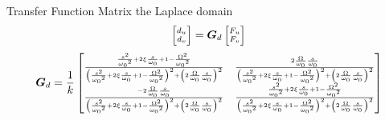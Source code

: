 \documentclass[t, minted]{clean-beamer}
\begin{document}
\begin{frame}[label={sec:org9fc6840}]{Transfer Function Matrix the Laplace domain}
\vspace{-1em}
\begin{equation*}
  {\scriptsize \begin{bmatrix} d_u \\ d_v \end{bmatrix} = \bm{G}_d \begin{bmatrix} F_u \\ F_v \end{bmatrix}}
\end{equation*}
\begin{equation*}
  {\scriptsize \bm{G}_{d} =
               \frac{1}{k}
               \begin{bmatrix}
                 \frac{\frac{s^2}{{\omega_0}^2} + 2 \xi \frac{s}{\omega_0} + 1 - \frac{{\Omega}^2}{{\omega_0}^2}}{\left( \frac{s^2}{{\omega_0}^2} + 2 \xi \frac{s}{\omega_0} + 1 - \frac{{\Omega}^2}{{\omega_0}^2} \right)^2 + \left( 2 \frac{\Omega}{\omega_0} \frac{s}{\omega_0} \right)^2} & \frac{2 \frac{\Omega}{\omega_0} \frac{s}{\omega_0}}{\left( \frac{s^2}{{\omega_0}^2} + 2 \xi \frac{s}{\omega_0} + 1 - \frac{{\Omega}^2}{{\omega_0}^2} \right)^2 + \left( 2 \frac{\Omega}{\omega_0} \frac{s}{\omega_0} \right)^2} \\
                 \frac{- 2 \frac{\Omega}{\omega_0} \frac{s}{\omega_0}}{\left( \frac{s^2}{{\omega_0}^2} + 2 \xi \frac{s}{\omega_0} + 1 - \frac{{\Omega}^2}{{\omega_0}^2} \right)^2 + \left( 2 \frac{\Omega}{\omega_0} \frac{s}{\omega_0} \right)^2} & \frac{\frac{s^2}{{\omega_0}^2} + 2 \xi \frac{s}{\omega_0} + 1 - \frac{{\Omega}^2}{{\omega_0}^2}}{\left( \frac{s^2}{{\omega_0}^2} + 2 \xi \frac{s}{\omega_0} + 1 - \frac{{\Omega}^2}{{\omega_0}^2} \right)^2 + \left( 2 \frac{\Omega}{\omega_0} \frac{s}{\omega_0} \right)^2}
               \end{bmatrix}}
\end{equation*}


\end{frame}
\end{document}
